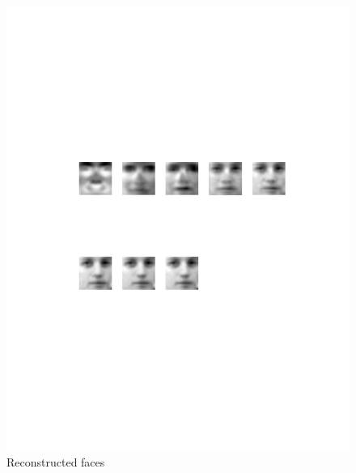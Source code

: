 \documentclass[a4paper,twoside=false,abstract=false,numbers=noenddot,
titlepage=false,headings=small,parskip=half,version=last]{scrartcl}
\theoremstyle{definition}
\theoremstyle{remark}
\begin{document}
\begin{figure}[t]
    \vspace{-70pt}
    \begin{center}
        \includegraphics[width=1.0\textwidth]{../Result_Pics/Reconstruct/rim.pdf}
    \end{center}
    \vspace{-170pt}
    \caption{Reconstructed faces}
    \label{fig:reconstruct}
\end{figure}
\end{document}
